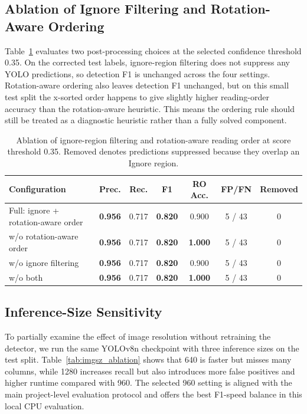 \documentclass[pdflatex,sn-mathphys-num]{sn-jnl}
\begin{document}
\subsection{Ablation of Ignore Filtering and Rotation-Aware Ordering}
Table~\ref{tab:ablation} evaluates two post-processing choices at the selected confidence threshold 0.35. On the corrected test labels, ignore-region filtering does not suppress any YOLO predictions, so detection F1 is unchanged across the four settings. Rotation-aware ordering also leaves detection F1 unchanged, but on this small test split the x-sorted order happens to give slightly higher reading-order accuracy than the rotation-aware heuristic. This means the ordering rule should still be treated as a diagnostic heuristic rather than a fully solved component.

\begin{table}
\centering
\scriptsize\setlength{\tabcolsep}{3pt}
\caption{Ablation of ignore-region filtering and rotation-aware reading order at score threshold 0.35. Removed denotes predictions suppressed because they overlap an Ignore region.}
\label{tab:ablation}
\begin{tabular}{lcccccc}
\toprule
Configuration & Prec. & Rec. & F1 & RO Acc. & FP/FN & Removed \\
\midrule
Full: ignore + rotation-aware order & \textbf{0.956} & 0.717 & \textbf{0.820} & 0.900 & 5 / 43 & 0 \\
w/o rotation-aware order & \textbf{0.956} & 0.717 & \textbf{0.820} & \textbf{1.000} & 5 / 43 & 0 \\
w/o ignore filtering & \textbf{0.956} & 0.717 & \textbf{0.820} & 0.900 & 5 / 43 & 0 \\
w/o both & \textbf{0.956} & 0.717 & \textbf{0.820} & \textbf{1.000} & 5 / 43 & 0 \\
\bottomrule
\end{tabular}
\end{table}


\subsection{Inference-Size Sensitivity}
To partially examine the effect of image resolution without retraining the detector, we run the same YOLOv8n checkpoint with three inference sizes on the test split. Table~\ref{tab:imgsz_ablation} shows that 640 is faster but misses many columns, while 1280 increases recall but also introduces more false positives and higher runtime compared with 960. The selected 960 setting is aligned with the main project-level evaluation protocol and offers the best F1-speed balance in this local CPU evaluation.
\end{document}
